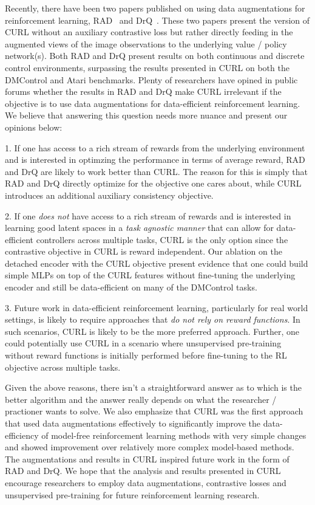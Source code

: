 \documentclass{article}
\begin{document}
Recently, there have been two papers published on using data augmentations for reinforcement learning, RAD~\cite{laskin2020reinforcement} and DrQ~\cite{kostrikov2020image}. These two papers present the version of CURL without an auxiliary contrastive loss but rather directly feeding in the augmented views of the image observations to the underlying value / policy network(s). Both RAD and DrQ present results on both continuous and discrete control environments, surpassing the results presented in CURL on both the DMControl and Atari benchmarks. Plenty of researchers have opined in public forums whether the results in RAD and DrQ make CURL irrelevant if the objective is to use data augmentations for data-efficient reinforcement learning. We believe that answering this question needs more nuance and present our opinions below:

1. If one has access to a rich stream of rewards from the underlying environment and is interested in optimzing the performance in terms of average reward, RAD and DrQ are likely to work better than CURL. The reason for this is simply that RAD and DrQ directly optimize for the objective one cares about, while CURL introduces an additional auxiliary consistency objective.

2. If one {\it does not} have access to a rich stream of rewards and is interested in learning good latent spaces in a {\it task agnostic manner} that can allow for data-efficient controllers across multiple tasks, CURL is the only option since the contrastive objective in CURL is reward independent. Our ablation on the detached encoder with the CURL objective present evidence that one could build simple MLPs on top of the CURL features without fine-tuning the underlying encoder and still be data-efficient on many of the DMControl tasks.

3. Future work in data-efficient reinforcement learning, particularly for real world settings, is likely to require approaches that {\it do not rely on reward functions}. In such scenarios, CURL is likely to be the more preferred approach. Further, one could potentially use CURL in a scenario where unsupervised pre-training without reward functions is initially performed before fine-tuning to the RL objective across multiple tasks.

Given the above reasons, there isn't a straightforward answer as to which is the better algorithm and the answer really depends on what the researcher / practioner wants to solve. We also emphasize that CURL was the first approach that used data augmentations effectively to significantly improve the data-efficiency of model-free reinforcement learning methods with very simple changes and showed improvement over relatively more complex model-based methods. The augmentations and results in CURL inspired future work in the form of RAD and DrQ. We hope that the analysis and results presented in CURL encourage researchers to employ data augmentations, contrastive losses and unsupervised pre-training for future reinforcement learning research. 
\end{document}
